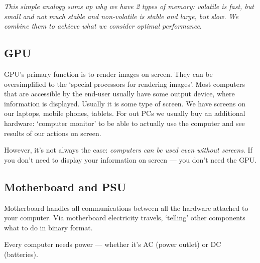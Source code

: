 \documentclass[../../what-is-computer.tex]{subfiles}
\begin{document}
        \emph{This simple analogy sums up why we have 2 types of memory: volatile is fast, but small and not much stable and non-volatile is stable and large, but slow. 
        We combine them to achieve what we consider optimal performance}. \par

    \subsection{GPU}\label{subsection:gpu}
        GPU's primary function is to render images on screen. They can be oversimplified to the `special processors for rendering images'. Most computers that are accessible
        by the end-user usually have some output device, where information is displayed. Usually it is some type of screen. We have screens on our laptops, mobile phones, tablets.
        For out PCs we usually buy an additional hardware: `computer monitor' to be able to actually use the computer and see results of our actions on screen. \par

        However, it's not always the case: \emph{computers can be used even without screens}. If you don't need to display your information on screen --- you don't need the GPU.
    \subsection{Motherboard and PSU}\label{subsection:motherboard-and-psu}
        Motherboard handles all communications between all the hardware attached to your computer. Via motherboard electricity travels, `telling' other components what to 
        do in binary format. \par
        Every computer needs power --- whether it's AC (power outlet) or DC (batteries). \par
    
\end{document}
